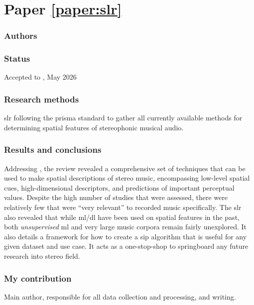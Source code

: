 \section*{Paper \ref{paper:slr}}
\textbf{}

\subsubsection*{Authors}

\subsubsection*{Status}
Accepted to , May 2026

\subsubsection*{Research methods}
\gls{slr} following the \gls{prisma} standard to gather all currently available methods for determining spatial features of stereophonic musical audio.

\subsubsection*{Results and conclusions}
Addressing \rqb{}, the review revealed a comprehensive set of techniques that can be used to make spatial descriptions of stereo music, encompassing low-level spatial cues, high-dimensional descriptors, and predictions of important perceptual values. Despite the high number of studies that were assessed, there were relatively few that were \enquote{very relevant} to recorded music specifically. The \gls{slr} also revealed that while \gls{ml}/\gls{dl} have been used on spatial features in the past, both \textit{unsupervised} \gls{ml} and very large music corpora remain fairly unexplored. It also details a framework for how to create a \gls{sip} algorithm that is useful for any given dataset and use case. It acts as a one-stop-shop to springboard any future research into stereo field.

\subsubsection*{My contribution}
Main author, responsible for all data collection and processing, and writing.